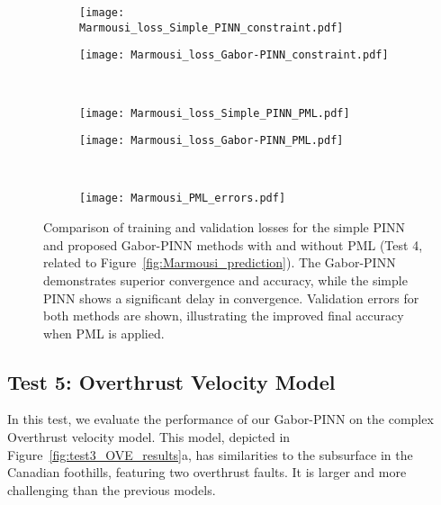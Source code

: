 \documentclass[authoryear, preprint, 12pt]{elsarticle}
\begin{document}
	\begin{figure}[h]
		\centering
		\begin{subfigure}[b]{0.32\textwidth}
			\texttt{[image: Marmousi\_loss\_Simple\_PINN\_constraint.pdf]}
		\end{subfigure}
		\begin{subfigure}[b]{0.32\textwidth}
			\texttt{[image: Marmousi\_loss\_Gabor-PINN\_constraint.pdf]}
		\end{subfigure}
		\\
		\begin{subfigure}[b]{0.32\textwidth}
			\texttt{[image: Marmousi\_loss\_Simple\_PINN\_PML.pdf]}
		\end{subfigure}
		\begin{subfigure}[b]{0.32\textwidth}
			\texttt{[image: Marmousi\_loss\_Gabor-PINN\_PML.pdf]}
		\end{subfigure}
\\
		\begin{subfigure}[b]{0.55\textwidth}
			\texttt{[image: Marmousi\_PML\_errors.pdf]}
		\end{subfigure}
		
\caption{Comparison of training and validation losses for the simple PINN and proposed Gabor-PINN methods with and without PML (Test 4, related to Figure~\ref{fig:Marmousi_prediction}). The Gabor-PINN demonstrates superior convergence and accuracy, while the simple PINN shows a significant delay in convergence. Validation errors for both methods are shown, illustrating the improved final accuracy when PML is applied.}
\label{fig:Marmousi_losses}
	\end{figure}
	
	
	\subsection{Test 5: Overthrust Velocity Model}  
	In this test, we evaluate the performance of our Gabor-PINN on the complex Overthrust velocity model. This model, depicted in Figure~\ref{fig:test3_OVE_results}a, has similarities to the subsurface in the Canadian foothills, featuring two overthrust faults. It is larger and more challenging than the previous models.  
	
\end{document}
